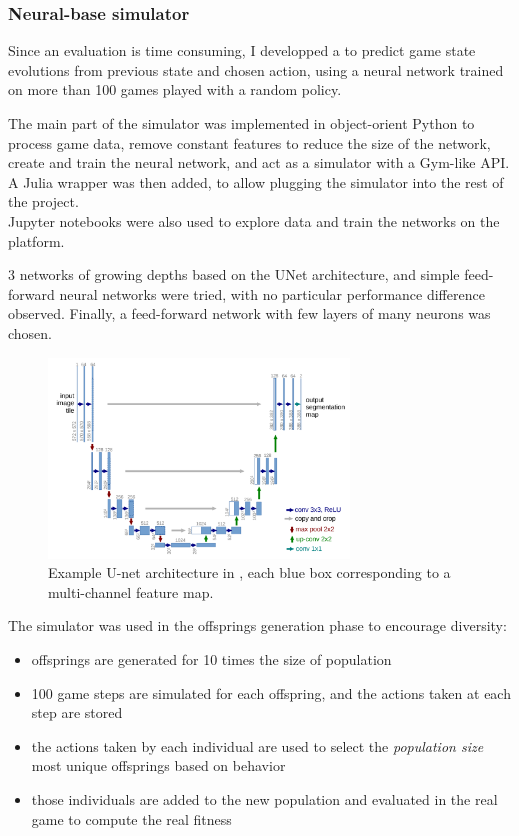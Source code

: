 \subsubsection{Neural-base simulator}
Since an evaluation is time consuming, I developped a  to predict game state evolutions from previous state and chosen action, using a neural network trained on more than 100 games played with a random policy.

The  main part of the simulator was implemented in object-orient Python to process game data, remove constant features to reduce the size of the network, create and train the neural network, and act as a simulator with a Gym-like API. A Julia wrapper was then added, to allow plugging the simulator into the rest of the project.\\
Jupyter notebooks were also used to explore data and train the networks on the  platform.  

3 networks of growing depths based on the UNet \cite{unet} architecture, and simple feed-forward neural networks were tried, with no particular performance difference observed. Finally, a feed-forward network with few layers of many neurons was chosen.  

\begin{figure}[H]
 \centering
 \captionsetup{justification=centering, margin=0.5cm}
 \includegraphics[width=8cm]{images/unet.PNG}
\caption{Example U-net architecture in \cite{unet}, each blue box corresponding to a multi-channel feature map.}
 \label{fig:dota-2-map}
\end{figure}

The simulator was used in the offsprings generation phase to encourage diversity:
\begin{itemize}
    \item offsprings are generated for 10 times the size of population 
    \item 100 game steps are simulated for each offspring, and the actions taken at each step are stored
    \item the actions taken by each individual are used to select the \textit{population size} most unique offsprings based on behavior
    \item those individuals are added to the new population and evaluated in the real game to compute the real fitness
\end{itemize}

